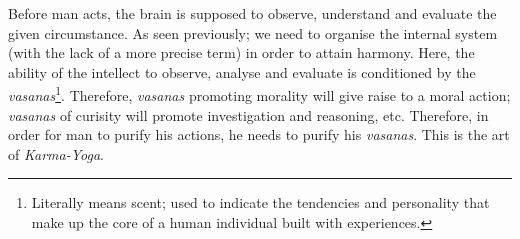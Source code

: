 \documentclass{article}
\newcommand{\tit}[1]{\textit{#1}}
\begin{document}
Before man acts, the brain is supposed to observe, understand and evaluate the given circumstance. As seen previously; we need to organise the internal system (with the lack of a more precise term) in order to attain harmony. Here, the ability of the intellect to observe, analyse and evaluate is conditioned by the \tit{vasanas}\footnote[1]{Literally means scent; used to indicate the tendencies and personality that make up the core of a human individual built with experiences.}. Therefore, \tit{vasanas} promoting morality will give raise to a moral action; \tit{vasanas} of curisity will promote investigation and reasoning, etc. Therefore, in order for man to purify his actions, he needs to purify his \tit{vasanas}. This is the art of \tit{Karma-Yoga}.
\end{document}
